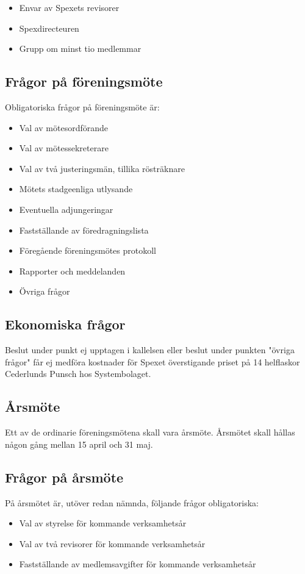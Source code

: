 \documentclass[a4paper]{article}
\begin{document}
\begin{itemize}
  \item Envar av Spexets revisorer
  \item Spexdirecteuren
  \item Grupp om minst tio medlemmar
\end{itemize}

\subsection{Frågor på föreningsmöte}
Obligatoriska frågor på föreningsmöte är:

\begin{itemize}
  \item Val av mötesordförande
  \item Val av mötessekreterare
  \item Val av två justeringsmän, tillika rösträknare
  \item Mötets stadgeenliga utlysande
  \item Eventuella adjungeringar
  \item Fastställande av föredragningslista
  \item Föregående föreningsmötes protokoll
  \item Rapporter och meddelanden
  \item Övriga frågor
\end{itemize}

\subsection{Ekonomiska frågor}
Beslut under punkt ej upptagen i kallelsen eller beslut under punkten "övriga frågor" får ej medföra kostnader för Spexet överstigande priset på 14 helflaskor Cederlunds Punsch hos Systembolaget.

\subsection{Årsmöte}
Ett av de ordinarie föreningsmötena skall vara årsmöte. Årsmötet skall hållas någon gång mellan 15 april och 31 maj.

\subsection{Frågor på årsmöte}
På årsmötet är, utöver redan nämnda, följande frågor obligatoriska:

\begin{itemize}
  \item Val av styrelse för kommande verksamhetsår
  \item Val av två revisorer för kommande verksamhetsår
  \item Fastställande av medlemsavgifter för kommande verksamhetsår
\end{itemize}
\end{document}
